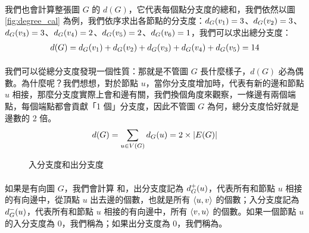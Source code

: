 \documentclass[12pt,a4paper,oneside]{report}
\begin{document}
\begin{CJK}{UTF8}{bkai}
\paragraph{}我們也會計算整張圖 $G$ 的\textbf{} $d(G)$，它代表每個點分支度的總和，我們依然以圖 \ref{fig:degree_cal} 為例，我們依序求出各節點的分支度：$d_{G}{(v_1)}=3$、$d_{G}{(v_2)}=3$、$d_{G}{(v_3)}=3$、$d_{G}{(v_4)}=2$、$d_{G}{(v_5)}=2$、$d_{G}{(v_6)}=1$，我們可以求出總分支度：
\begin{align*}
d(G)=d_{G}{(v_1)}+d_{G}{(v_2)}+d_{G}{(v_3)}+d_{G}{(v_4)}+d_{G}{(v_5)}=14
\end{align*}
\paragraph{}我們可以從總分支度發現一個性質：那就是不管圖 $G$ 長什麼樣子，$d(G)$ 必為偶數。為什麼呢？我們想想，對於節點 $u$，當你分支度增加時，代表有新的邊和節點 $u$ 相接，那麼分支度實際上會和邊有關，我們換個角度來觀察，一條邊有兩個端點，每個端點都會貢獻「1 個」分支度，因此不管圖 $G$ 為何，總分支度恰好就是邊數的 2 倍。
\begin{align}
\label{eq:degree_twice_edges}
d(G)=\sum_{u\in{V(G)}}{d_{G}{(u)}}=2\times{|E(G)|}
\end{align}
\begin{figure}[h!]
\centering
{}
\caption{入分支度和出分支度}
\label{fig:directed_cal_degree}
\end{figure}

\paragraph{}如果是有向圖 $G$，我們會計算\textbf{} 和\textbf{}，出分支度記為 $d^{+}_{G}{(u)}$，代表所有和節點 $u$ 相接的有向邊中，從頂點 $u$ 出去邊的個數，也就是所有 $\langle{}{{u},{v}}\rangle{}$ 的個數；入分支度記為 $d^{-}_{G}{(u)}$，代表所有和節點 $u$ 相接的有向邊中，所有 $\langle{}{{v},{u}}\rangle{}$ 的個數。如果一個節點 $u$ 的入分支度為 0，我們稱為\textbf{}；如果出分支度為 0，我們稱為\textbf{}。

\end{CJK}
\end{document}
